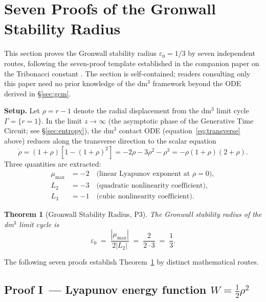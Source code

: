 \documentclass[14pt,a4paper]{extarticle}
\newtheorem{theorem}{Theorem}[section]
\begin{document}
\section{Seven Proofs of the Gronwall Stability Radius}
\label{sec:gronwall}
\label{sec:seven-proofs}

This section proves the Gronwall stability radius $\varepsilon_0 = 1/3$
by seven independent routes, following the seven-proof template
established in the companion paper on the Tribonacci constant
\cite{TOGT2026}.
The section is self-contained; readers consulting only this paper
need no prior knowledge of the dm$^3$ framework beyond the ODE
derived in \S\ref{sec:gcm}.

\medskip

\noindent\textbf{Setup.}
Let $\rho = r - 1$ denote the radial displacement from the dm$^3$
limit cycle $\Gamma = \{r=1\}$.
In the limit $z \to \infty$ (the asymptotic phase of the Generative
Time Circuit; see \S\ref{sec:entropy}), the dm$^3$ contact ODE
(equation~\eqref{eq:transverse} above) reduces along the transverse direction to
the scalar equation
\begin{equation}
  \dot\rho
    = (1+\rho)\!\left[1 - (1+\rho)^2\right]
    = -2\rho - 3\rho^2 - \rho^3
    = -\rho(1+\rho)(2+\rho).
  \label{eq:transverse}
\end{equation}
Three quantities are extracted:
\begin{align*}
  \mu_{\max} &= -2 \quad \text{(linear Lyapunov exponent at $\rho=0$)},\\
  L_2         &= -3 \quad \text{(quadratic nonlinearity coefficient)},\\
  L_3         &= -1 \quad \text{(cubic nonlinearity coefficient)}.
\end{align*}

\begin{theorem}[Gronwall Stability Radius, P3]
\label{thm:eps0}
The Gronwall stability radius of the dm$^3$ limit cycle is
\[
  \varepsilon_0
    \;=\; \frac{|\mu_{\max}|}{2|L_2|}
    \;=\; \frac{2}{2 \cdot 3}
    \;=\; \frac{1}{3}.
\]
\end{theorem}

The following seven proofs establish Theorem~\ref{thm:eps0} by
distinct mathematical routes.

\subsection*{Proof I\, — Lyapunov energy function $W = \tfrac{1}{2}\rho^2$}
\end{document}
